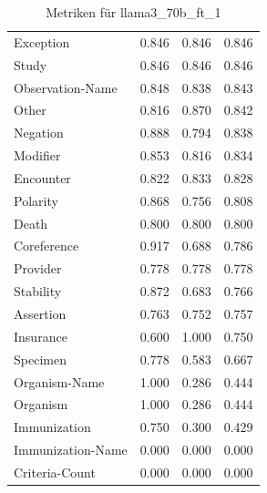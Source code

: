 \begin{table}[htbp]
\begin{tabular}{p{5cm}ccc}
Exception & 0.846 & 0.846 & 0.846 \\
Study & 0.846 & 0.846 & 0.846 \\
Observation-Name & 0.848 & 0.838 & 0.843 \\
Other & 0.816 & 0.870 & 0.842 \\
Negation & 0.888 & 0.794 & 0.838 \\
Modifier & 0.853 & 0.816 & 0.834 \\
Encounter & 0.822 & 0.833 & 0.828 \\
Polarity & 0.868 & 0.756 & 0.808 \\
Death & 0.800 & 0.800 & 0.800 \\
Coreference & 0.917 & 0.688 & 0.786 \\
Provider & 0.778 & 0.778 & 0.778 \\
Stability & 0.872 & 0.683 & 0.766 \\
Assertion & 0.763 & 0.752 & 0.757 \\
Insurance & 0.600 & 1.000 & 0.750 \\
Specimen & 0.778 & 0.583 & 0.667 \\
Organism-Name & 1.000 & 0.286 & 0.444 \\
Organism & 1.000 & 0.286 & 0.444 \\
Immunization & 0.750 & 0.300 & 0.429 \\
Immunization-Name & 0.000 & 0.000 & 0.000 \\
Criteria-Count & 0.000 & 0.000 & 0.000 \\
\bottomrule
\end{tabular}
\caption{Metriken für llama3_70b_ft_1}
\label{tab:metrics_llama3_70b_ft_1}
\end{table}